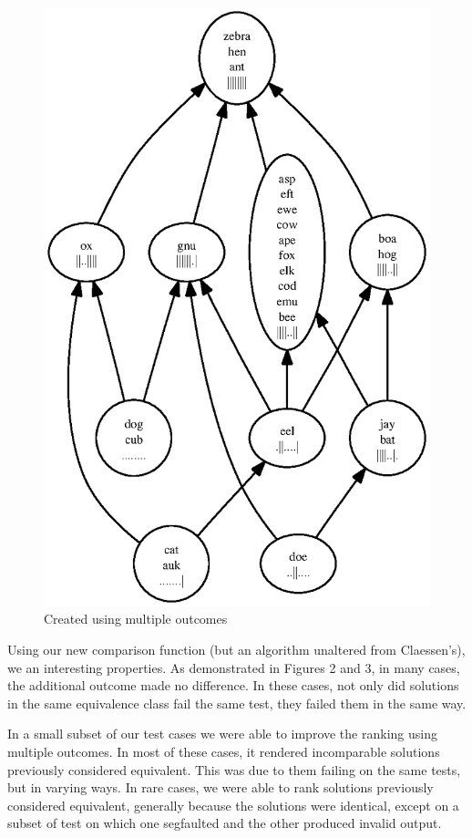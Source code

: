 \documentclass[11pt,twoside]{article}
\theoremstyle{definition}
\begin{document}
\begin{figure}
\includegraphics[scale=0.75]{rank2.ps}
\caption{Created using multiple outcomes}
\end{figure}

Using our new comparison function (but an algorithm unaltered from Claessen's), we an interesting properties. As demonstrated in Figures 2 and 3, in many cases, the additional outcome made no difference. In these cases, not only did solutions in the same equivalence class fail the same test, they failed them in the same way.

In a small subset of our test cases
we were able to improve the ranking using multiple outcomes. In most of these cases, it rendered incomparable solutions previously considered equivalent. This was due to them failing on the same tests, but in varying ways. In rare cases, we were able to rank solutions previously considered equivalent, generally because the solutions were identical, except on a subset of test on which one segfaulted and the other produced invalid output.
\end{document}
